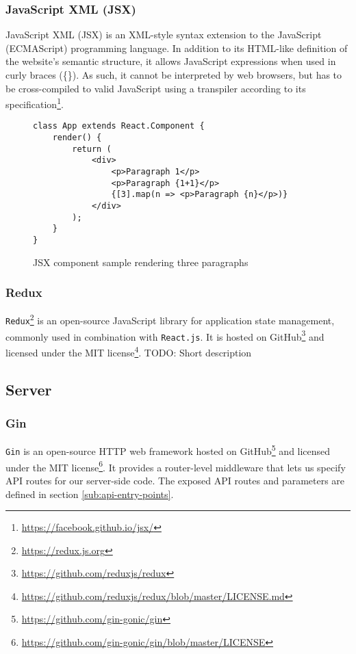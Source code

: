 \subsubsection{JavaScript XML (JSX)}
JavaScript XML (JSX) is an XML-style syntax extension to the JavaScript (ECMAScript) programming language.
In addition to its HTML-like definition of the website's semantic structure, it allows JavaScript expressions when used in curly braces (\{\}).
As such, it cannot be interpreted by web browsers, but has to be cross-compiled to valid JavaScript using a transpiler according to its specification\footnote{\url{https://facebook.github.io/jsx/}}.


\begin{figure}[H]
\begin{verbatim}
class App extends React.Component {
    render() {
        return (
            <div>
                <p>Paragraph 1</p>
                <p>Paragraph {1+1}</p>
                {[3].map(n => <p>Paragraph {n}</p>)}
            </div>
        );
    }
}
\end{verbatim}
\caption{JSX component sample rendering three paragraphs}
\end{figure}


\subsubsection{Redux}
\texttt{Redux}\footnote{\url{https://redux.js.org}} is an open-source JavaScript library for application state management, commonly used in combination with \texttt{React.js}.
It is hosted on GitHub\footnote{\url{https://github.com/reduxjs/redux}} and licensed under the MIT license\footnote{\url{https://github.com/reduxjs/redux/blob/master/LICENSE.md}}.
TODO: Short description 

\subsection{Server}

\subsubsection{Gin}
\texttt{Gin} is an open-source HTTP web framework hosted on GitHub\footnote{\url{https://github.com/gin-gonic/gin}} and licensed under the MIT license\footnote{\url{https://github.com/gin-gonic/gin/blob/master/LICENSE}}.
It provides a router-level middleware that lets us specify API routes for our server-side code. The exposed API routes and parameters are defined in section \ref{sub:api-entry-points}.